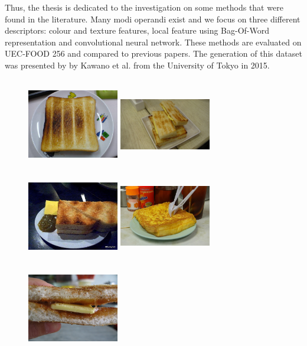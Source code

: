 Thus, the thesis is dedicated to the investigation on some methods that were found in the literature. Many modi operandi exist and we focus on three different descriptors: colour and texture features, local feature using Bag-Of-Word representation and convolutional neural network. These methods are evaluated on UEC-FOOD 256 and compared to previous papers. The generation of this dataset was presented by \cite{Kawano2015} by Kawano et al. from the University of Tokyo in 2015.

\begin{figure}
    \centering
    \includegraphics[height=4cm, width=4cm]{img/kaya_toast_1.jpg}
    \includegraphics[height=4cm, width=4cm]{img/kaya_toast_2.jpg}
    \includegraphics[height=4cm, width=4cm]{img/kaya_toast_3.jpg}
    \includegraphics[height=4cm, width=4cm]{img/kaya_toast_4.jpg}
    \includegraphics[height=4cm, width=4cm]{img/kaya_toast_5.jpg}

\end{figure}
